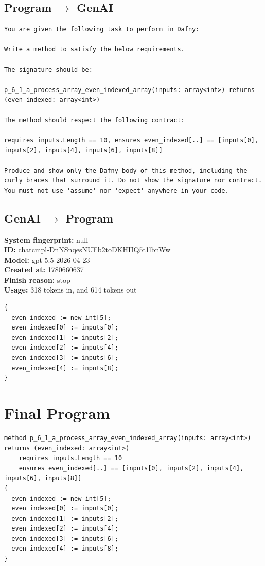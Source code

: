\documentclass{article}
\begin{document}
\subsection*{Program $\rightarrow$ GenAI}
\begin{lstlisting}
You are given the following task to perform in Dafny:

Write a method to satisfy the below requirements.

The signature should be:

p_6_1_a_process_array_even_indexed_array(inputs: array<int>) returns (even_indexed: array<int>)

The method should respect the following contract:

requires inputs.Length == 10, ensures even_indexed[..] == [inputs[0], inputs[2], inputs[4], inputs[6], inputs[8]]

Produce and show only the Dafny body of this method, including the curly braces that surround it. Do not show the signature nor contract. You must not use 'assume' nor 'expect' anywhere in your code.
\end{lstlisting}
\subsection*{GenAI $\rightarrow$ Program}
\textbf{System fingerprint: }null
\\\textbf{ID: }chatcmpl-DnNSnqesNUFb2toDKHIIQ5t1lbnWw
\\\textbf{Model: }gpt-5.5-2026-04-23
\\\textbf{Created at: }1780660637
\\\textbf{Finish reason: }stop
\\\textbf{Usage: }318 tokens in, and 614 tokens out
\begin{lstlisting}
{
  even_indexed := new int[5];
  even_indexed[0] := inputs[0];
  even_indexed[1] := inputs[2];
  even_indexed[2] := inputs[4];
  even_indexed[3] := inputs[6];
  even_indexed[4] := inputs[8];
}
\end{lstlisting}
\section*{Final Program}
\begin{lstlisting}
method p_6_1_a_process_array_even_indexed_array(inputs: array<int>) returns (even_indexed: array<int>)
	requires inputs.Length == 10
	ensures even_indexed[..] == [inputs[0], inputs[2], inputs[4], inputs[6], inputs[8]]
{
  even_indexed := new int[5];
  even_indexed[0] := inputs[0];
  even_indexed[1] := inputs[2];
  even_indexed[2] := inputs[4];
  even_indexed[3] := inputs[6];
  even_indexed[4] := inputs[8];
}
\end{lstlisting}
\end{document}

